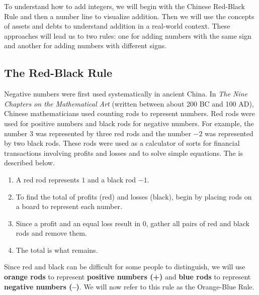 \documentclass{ximera}[font=12pt]
\begin{document}
To understand how to add integers, we will begin with the Chinese Red-Black Rule and then a number line to visualize addition.  Then we will 
use the concepts of assets and debts to understand addition in a real-world context.  These approaches will lead us to two rules: one for adding 
numbers with the same sign and another for adding numbers with different signs.

\subsection*{The Red-Black Rule}

Negative numbers were first used systematically in ancient China. In \emph{The Nine Chapters on the Mathematical Art} (written between about 200 BC and 100 AD), Chinese mathematicians used counting rods to represent numbers.  Red rods were used for positive numbers and black rods for negative numbers.  For example, the number 3 was
represented by three red rods and the number $-2$ was represented by two black rods.  These rods were used as a calculator of sorts for financial 
transactions involving profits and losses and to solve simple equations.  The  is described below.

\begin{enumerate}%
\item A red rod represents $1$ and a black rod $-1.$  

\item To find the total of profits (red) and losses (black), begin by placing rods on a board to represent each number.

\item Since a profit and an equal loss result in 0, gather all pairs of red and black rods and remove them.

\item The total is what remains.
\end{enumerate}


Since red and black can be difficult for some people to distinguish, we will use \textcolor{orange!85!black}{\textbf{orange rods}} to 
represent \textcolor{orange!85!black}{\textbf{positive numbers (+)}} and \textcolor{blue!70!black}{\textbf{blue rods}} to represent 
\textcolor{blue!70!black}{\textbf{negative numbers (--)}}.
We will now refer to this rule as the Orange-Blue Rule.
\end{document}
